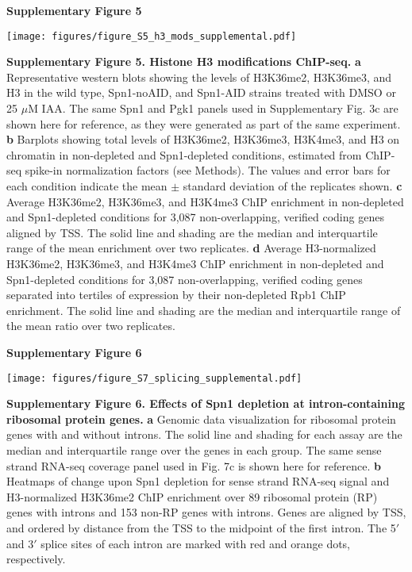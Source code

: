 \documentclass[8pt]{extarticle}
\begin{document}
\newpage

\textbf{\large Supplementary Figure 5}

{\texttt{[image: figures/figure\_S5\_h3\_mods\_supplemental.pdf]}\par}

\textbf{Supplementary Figure 5. Histone H3 modifications ChIP-seq.}
\textbf{a} Representative western blots showing the levels of H3K36me2, H3K36me3, and H3 in the wild type, Spn1-noAID, and Spn1-AID strains treated with DMSO or 25 $\mu$M IAA.
The same Spn1 and Pgk1 panels used in Supplementary Fig. 3c are shown here for reference, as they were generated as part of the same experiment.
\textbf{b} Barplots showing total levels of H3K36me2, H3K36me3, H3K4me3, and H3 on chromatin in non-depleted and Spn1-depleted conditions, estimated from ChIP-seq spike-in normalization factors (see Methods).
The values and error bars for each condition indicate the mean $\pm$ standard deviation of the replicates shown.
\textbf{c} Average H3K36me2, H3K36me3, and H3K4me3 ChIP enrichment in non-depleted and Spn1-depleted conditions for 3,087 non-overlapping, verified coding genes aligned by TSS.
The solid line and shading are the median and interquartile range of the mean enrichment over two replicates.
\textbf{d} Average H3-normalized H3K36me2, H3K36me3, and H3K4me3 ChIP enrichment in non-depleted and Spn1-depleted conditions for 3,087 non-overlapping, verified coding genes separated into tertiles of expression by their non-depleted Rpb1 ChIP enrichment.
The solid line and shading are the median and interquartile range of the mean ratio over two replicates.

\newpage




\textbf{\large Supplementary Figure 6}

{\texttt{[image: figures/figure\_S7\_splicing\_supplemental.pdf]}\par}

\textbf{Supplementary Figure 6. Effects of Spn1 depletion at intron-containing ribosomal protein genes.}
\textbf{a} Genomic data visualization for ribosomal protein genes with and without introns.
The solid line and shading for each assay are the median and interquartile range over the genes in each group.
The same sense strand RNA-seq coverage panel used in Fig. 7c is shown here for reference.
\textbf{b} Heatmaps of change upon Spn1 depletion for sense strand RNA-seq signal and H3-normalized H3K36me2 ChIP enrichment over 89 ribosomal protein (RP) genes with introns and 153 non-RP genes with introns.
Genes are aligned by TSS, and ordered by distance from the TSS to the midpoint of the first intron.
The 5$\prime$ and 3$\prime$ splice sites of each intron are marked with red and orange dots, respectively.

\newpage
\end{document}
